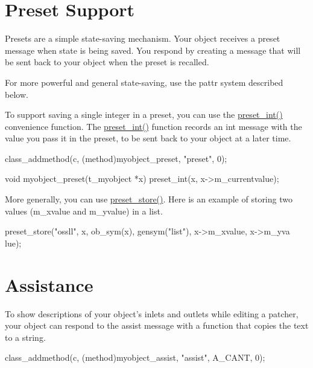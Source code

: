 \hypertarget{chapter_enhancements_chapter_enhancements_presets}{}\section{Preset Support}\label{chapter_enhancements_chapter_enhancements_presets}
Presets are a simple state-\/saving mechanism. Your object receives a preset message when state is being saved. You respond by creating a message that will be sent back to your object when the preset is recalled.

For more powerful and general state-\/saving, use the pattr system described below.

To support saving a single integer in a preset, you can use the \hyperlink{group__presets_gaf1da6073fef8e3f896602cf7f9738a23}{preset\_\-int()} convenience function. The \hyperlink{group__presets_gaf1da6073fef8e3f896602cf7f9738a23}{preset\_\-int()} function records an int message with the value you pass it in the preset, to be sent back to your object at a later time.


\begin{DoxyCode}
    class_addmethod(c, (method)myobject_preset, "preset", 0);

    void myobject_preset(t_myobject *x)
    {
        preset_int(x, x->m_currentvalue);
    }
\end{DoxyCode}


More generally, you can use \hyperlink{group__presets_ga5f6d86fdc24e371604b764e7581a4fcb}{preset\_\-store()}. Here is an example of storing two values (m\_\-xvalue and m\_\-yvalue) in a list. 
\begin{DoxyCode}
        preset_store("ossll", x, ob_sym(x), gensym("list"), x->m_xvalue, x->m_yva
      lue);
\end{DoxyCode}
\hypertarget{chapter_enhancements_chapter_enhancements_assistance}{}\section{Assistance}\label{chapter_enhancements_chapter_enhancements_assistance}
To show descriptions of your object's inlets and outlets while editing a patcher, your object can respond to the assist message with a function that copies the text to a string.


\begin{DoxyCode}
    class_addmethod(c, (method)myobject_assist, "assist", A_CANT, 0);
\end{DoxyCode}


